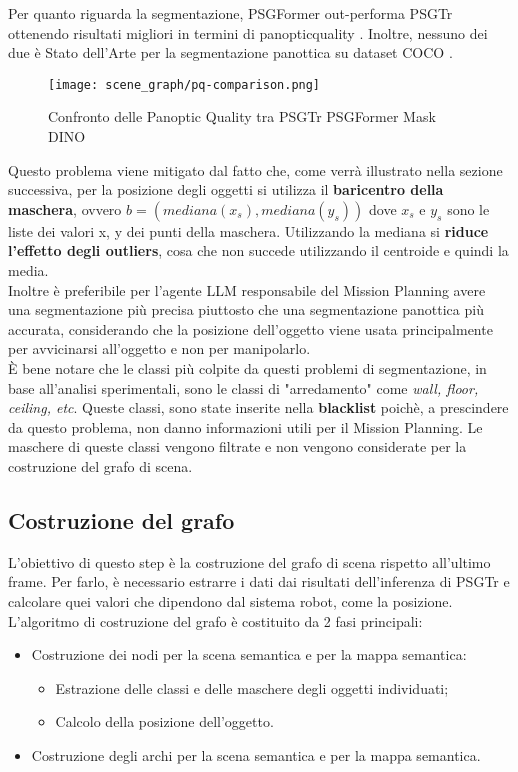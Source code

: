 \noindent
Per quanto riguarda la segmentazione, PSGFormer out-performa PSGTr ottenendo risultati migliori in termini di \gls{panopticquality} \cite{pq}. Inoltre, nessuno dei due è Stato dell'Arte per la segmentazione panottica su dataset COCO \cite{maskdino}.\\
\begin{figure}[H]
  \centering
  \texttt{[image: scene\_graph/pq-comparison.png]}
  \caption{Confronto delle Panoptic Quality tra PSGTr PSGFormer  Mask DINO}
  \label{fig:example_barchart}
\end{figure}
\noindent
Questo problema viene mitigato dal fatto che, come verrà illustrato nella sezione successiva, per la posizione degli oggetti si utilizza il \textbf{baricentro della maschera}, ovvero $b = (mediana(x_s), mediana(y_s))$ dove $x_s$ e $y_s$ sono le liste dei valori x, y dei punti della maschera. Utilizzando la mediana si \textbf{riduce l'effetto degli outliers}, cosa che non succede utilizzando il centroide e quindi la media. \\
Inoltre è preferibile per l'agente LLM responsabile del Mission Planning avere una segmentazione più precisa piuttosto che una segmentazione panottica più accurata, considerando che la posizione dell'oggetto viene usata principalmente per avvicinarsi all'oggetto e non per manipolarlo.\\
È bene notare che le classi più colpite da questi problemi di segmentazione, in base all'analisi sperimentali, sono le classi di "arredamento" come \textit{wall, floor, ceiling, etc}. Queste classi, sono state inserite nella \textbf{blacklist} poichè, a prescindere da questo problema, non danno informazioni utili per il Mission Planning. Le maschere di queste classi vengono filtrate e non vengono considerate per la costruzione del grafo di scena.

\subsection{Costruzione del grafo}
L'obiettivo di questo step è la costruzione del grafo di scena rispetto all'ultimo frame. Per farlo, è necessario estrarre i dati dai risultati dell'inferenza di PSGTr e calcolare quei valori che dipendono dal sistema robot, come la posizione.
L'algoritmo di costruzione del grafo è costituito da 2 fasi principali:
\begin{itemize}
  \item Costruzione dei nodi per la scena semantica e per la mappa semantica:
        \begin{itemize}
          \item Estrazione delle classi e delle maschere degli oggetti individuati;
          \item Calcolo della posizione dell'oggetto.
        \end{itemize}
  \item Costruzione degli archi per la scena semantica e per la mappa semantica.
\end{itemize}

